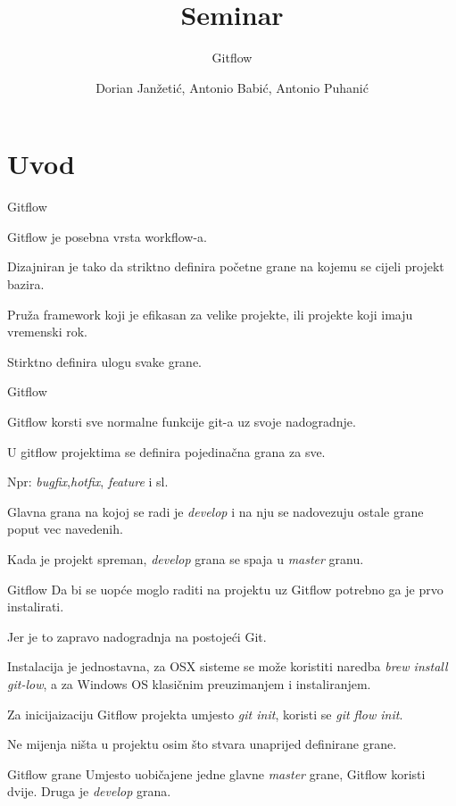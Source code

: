 \documentclass[10pt]{beamer}
\title{Seminar}
\subtitle{Gitflow}
\date{}
\author{Dorian Janžetić, Antonio Babić, Antonio Puhanić}
\institute{Tehnički Fakultet Rijeka}
\begin{document}
\maketitle

\section{Uvod}
\begin{frame}{Gitflow}

Gitflow je posebna vrsta workflow-a.

Dizajniran je tako da striktno definira početne grane na kojemu se cijeli projekt bazira.

Pruža framework koji je efikasan za velike projekte, ili projekte koji imaju vremenski rok.

Stirktno definira ulogu svake grane.\nocite{}
\end{frame}
\begin{frame}{Gitflow}

Gitflow korsti sve normalne funkcije git-a uz svoje nadogradnje.

U gitflow projektima se definira pojedinačna grana za sve.

Npr: \textit{bugfix},\textit{hotfix}, \textit{feature} i sl.

Glavna grana na kojoj se radi je \textit{develop} i na nju se nadovezuju ostale grane poput vec navedenih.

Kada je projekt spreman, \textit{develop} grana se spaja u \textit{master} granu.

\end{frame}
\begin{frame}{Gitflow}
Da bi se uopće moglo raditi na projektu uz Gitflow potrebno ga je prvo instalirati.

Jer je to zapravo nadogradnja na postojeći Git.

Instalacija je jednostavna, za OSX sisteme se može koristiti naredba \textit{brew install git-low}, a za Windows OS klasičnim preuzimanjem i instaliranjem.

Za inicijaizaciju Gitflow projekta umjesto \textit{git init}, koristi se \textit{git flow init}.

Ne mijenja ništa u projektu osim što stvara unaprijed definirane grane.
\end{frame}
\begin{frame}{Gitflow grane}
Umjesto uobičajene jedne glavne \textit{master} grane, Gitflow koristi dvije.
Druga je \textit{develop} grana.

{
\setlength{\fboxsep}{1pt}
\setlength{\fboxrule}{1pt}
}

\end{frame}
\end{document}
